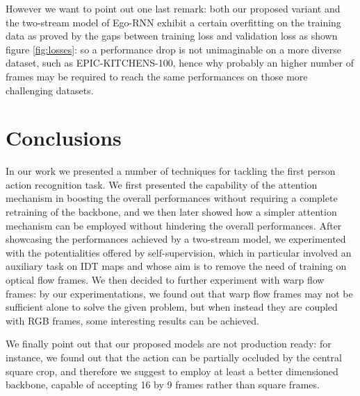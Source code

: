 \documentclass[10pt,twocolumn,letterpaper]{article}
\begin{document}
However we want to point out one last remark: both our proposed variant and the two-stream model of Ego-RNN exhibit a certain overfitting on the training data as proved by the gaps between training loss and validation loss as shown figure \ref{fig:losses}: so a performance drop is not unimaginable on a more diverse dataset, such as EPIC-KITCHENS-100, hence why probably an higher number of frames may be required to reach the same performances on those more challenging datasets.

\section{Conclusions}

In our work we presented a number of techniques for tackling the first person action recognition task. We first presented the capability of the attention mechanism in boosting the overall performances without requiring a complete retraining of the backbone, and we then later showed how a simpler attention mechanism can be employed without hindering the overall performances. After showcasing the performances achieved by a two-stream model, we experimented with the potentialities offered by self-supervision, which in particular involved an auxiliary task on IDT maps and whose aim is to remove the need of training on optical flow frames. We then decided to further experiment with warp flow frames: by our experimentations, we found out that warp flow frames may not be sufficient alone to solve the given problem, but when instead they are coupled with RGB frames, some interesting results can be achieved.

We finally point out that our proposed models are not production ready: for instance, we found out that the action can be partially occluded by the central square crop, and therefore we suggest to employ at least a better dimensioned backbone, capable of accepting 16 by 9 frames rather than square frames.

\vfill

{\small


}
\end{document}
